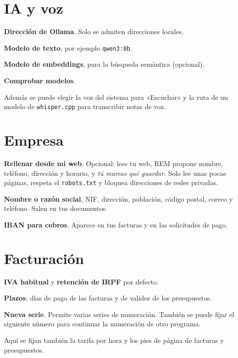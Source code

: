 \section{IA y voz}
\begin{leyenda}
\item[\mk{1}] \textbf{Dirección de Ollama}. Solo se admiten direcciones locales.
\item[\mk{2}] \textbf{Modelo de texto}, por ejemplo \texttt{qwen3:8b}.
\item[\mk{3}] \textbf{Modelo de embeddings}, para la búsqueda semántica (opcional).
\item[\mk{4}] \textbf{Comprobar modelos}.
\end{leyenda}
Además se puede elegir la voz del sistema para «Escuchar» y la ruta de un modelo de \texttt{whisper.cpp} para transcribir notas de voz.

\section{Empresa}
\begin{leyenda}
\item[\mk{1}] \textbf{Rellenar desde mi web}. Opcional: lees tu web, REM propone nombre, teléfono, dirección y horario, y \emph{tú marcas qué guardar}. Solo lee unas pocas páginas, respeta el \texttt{robots.txt} y bloquea direcciones de redes privadas.
\item[\mk{2}] \textbf{Nombre o razón social}, NIF, dirección, población, código postal, correo y teléfono. Salen en tus documentos.
\item[\mk{3}] \textbf{IBAN para cobros}. Aparece en tus facturas y en las solicitudes de pago.
\end{leyenda}

\section{Facturación}
\begin{leyenda}
\item[\mk{1}] \textbf{IVA habitual} y \textbf{retención de IRPF} por defecto.
\item[\mk{2}] \textbf{Plazos}: días de pago de las facturas y de validez de los presupuestos.
\item[\mk{3}] \textbf{Nueva serie}. Permite varias series de numeración. También se puede fijar el siguiente número para continuar la numeración de otro programa.
\end{leyenda}
Aquí se fijan también la tarifa por hora y los pies de página de facturas y presupuestos.

